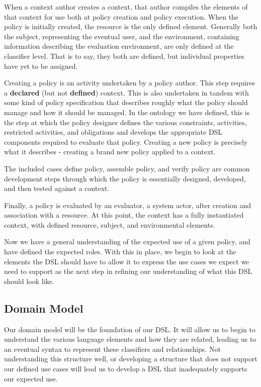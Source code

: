 When a context author creates a context, that author compiles the elements of that context for use both at policy creation and policy execution.  When the policy is initially created, the resource is the only defined element.  Generally both the subject, representing the eventual user, and the environment, containing information describing the evaluation environment, are only defined at the classifier level.  That is to say, they both are defined, but individual properties have yet to be assigned.

Creating a policy is an activity undertaken by a policy author.  This step requires a \textbf{declared} (but not \textbf{defined}) context.  This is also undertaken in tandem with some kind of policy specification that describes roughly what the policy should manage and how it should be managed.  In the ontology we have defined, this is the step at which the policy designer defines the various constraints, activities, restricted activities, and obligations and develops the appropriate DSL components required to evaluate that policy.  Creating a new policy is precisely what it describes - creating a brand new policy applied to a context.

The included cases define policy, assemble policy, and verify policy are common development steps through which the policy is essentially designed, developed, and then tested against a context.

Finally, a policy is evaluated by an evaluator, a system actor, after creation and association with a resource.  At this point, the context has a fully instantiated context, with defined resource, subject, and environmental elements.

Now we have a general understanding of the expected use of a given policy, and have defined the expected roles.  With this in place, we begin to look at the elements the DSL should have to allow it to express the use cases we expect we need to support as the next step in refining our understanding of what this DSL should look like.

\subsection{Domain Model}
Our domain model will be the foundation of our DSL.  It will allow us to begin to understand the various language elements and how they are related, leading us to an eventual syntax to represent these classifiers and relationships.  Not understanding this structure well, or developing a structure that does not support our defined use cases will lead us to develop a DSL that inadequately supports our expected use.

